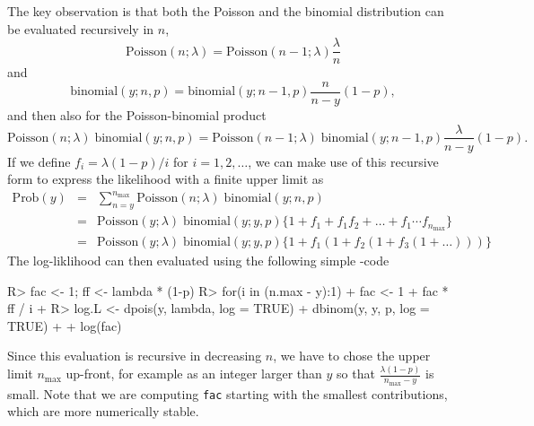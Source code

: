 \documentclass[article]{jss}
\begin{document}
The key observation is that both the Poisson and the binomial distribution can be evaluated recursively in $n$,
\begin{displaymath}
    \text{Poisson}(n; \lambda) = \text{Poisson}(n-1; \lambda) \frac{\lambda}{n}
\end{displaymath}
and
\begin{displaymath}
    \text{binomial}(y; n, p) = \text{binomial}(y; n-1, p) \frac{n}{n-y}(1-p),
\end{displaymath}
and then also for the Poisson-binomial product
\begin{displaymath}
    \text{Poisson}(n ; \lambda) \; \text{binomial}(y;  n, p)
    =
    \text{Poisson}(n-1; \lambda) \; \text{binomial}(y; n-1, p)
    \frac{\lambda}{n-y}(1-p).
\end{displaymath}
If we define $f_i = \lambda(1-p)/i$ for $i=1, 2, \ldots$, we can make use of this recursive form to express the likelihood with a finite upper limit as
\begin{eqnarray}
    \text{Prob}(y) &=& \sum_{n = y}^{n_{\text{max}}}
                       \text{Poisson}(n ; \lambda)\;
                      \text{binomial}(y;  n, p) \nonumber\\
                   &=& \text{Poisson}(y; \lambda)\; \text{binomial}(y; y, p)
                       \Big\{ 1 + f_1 + f_1f_2 +
                    \ldots
                      +f_1\cdots f_{n_\text{max}}
                       \Big\} \nonumber\\
                   &=& \text{Poisson}(y; \lambda)\; \text{binomial}(y; y, p)
                       \Big\{ 1 + f_1(1+f_2(1+f_3(1+ \dots)))\Big\}\nonumber
\end{eqnarray}
The log-liklihood can then evaluated using the following simple -code
\begin{Code}
R> fac <- 1; ff <- lambda * (1-p)
R> for(i in (n.max - y):1){
+    fac <- 1 + fac * ff / i
+  } 
R> log.L <- dpois(y, lambda, log = TRUE) + dbinom(y, y, p, log = TRUE) + 
+           log(fac)
\end{Code}
Since this evaluation is recursive in decreasing $n$, we have to chose the upper limit $n_\text{max}$ up-front, for example as an integer larger than $y$ so that $\frac{\lambda (1-p)}{n_\text{max}-y}$ is small. Note that we are computing \texttt{fac} starting with the smallest contributions, which are more numerically stable.
\end{document}

